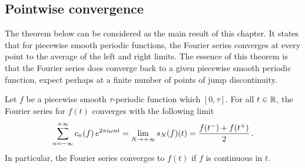 \subsection{Pointwise convergence}
The theorem below can be considered as the main result of this chapter. It states that for
piecewise smooth periodic functions, the Fourier series converges at every point to the
average of the left and right limits. The essence of this theorem is that the Fourier
series does converge back to a given piecewise smooth periodic function, expect perhaps at
a finite number of points of jump discontinuity.
\begin{theorem}
  \label{thm:fourier-pt}
  Let $f$ be a piecewise smooth $\tau$-periodic function which $[0,\tau]$. For all
  $t\in\mathbb{R}$, the Fourier series for $f(t)$ converges with the following limit
  \begin{equation}
    \sum_{n=-\infty}^{+\infty}c_n(f)\,e^{2\pi i \omega nt}=\lim_{N\to+\infty}s_N(f)(t)
    =\frac{f(t^-)+f(t^+)}{2}\,.
  \end{equation}
  In particular, the Fourier series converges to $f(t)$ if $f$ is continuous in $t$.
\end{theorem}
